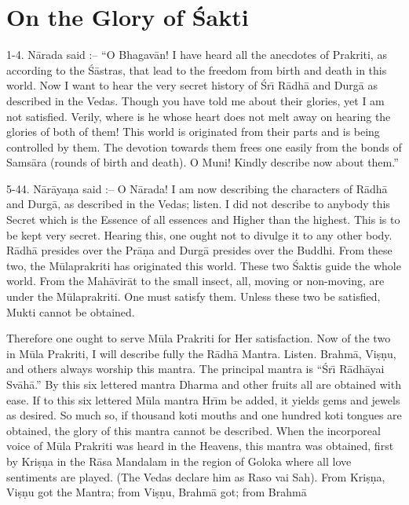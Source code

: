 \chapter{On the Glory of \'Sakti}

1-4. N\=arada said :-- ``O Bhagav\=an! I have heard all the anecdotes of Prakriti, as according to the \'S\=astras, that lead to the freedom from birth and death in this world. Now I want to hear the very secret history of \'Sr\={\i} R\=adh\=a and Durg\=a as described in the Vedas. Though you have told me about their glories, yet I am not satisfied. Verily, where is he whose heart does not melt away on hearing the glories of both of them! This world is originated from their parts and is being controlled by them. The devotion towards them frees one easily from the bonds of Sams\=ara (rounds of birth and death). O Muni! Kindly describe now about them.''

5-44. N\=ar\=aya\d{n}a said :-- O N\=arada! I am now describing the characters of R\=adh\=a and Durg\=a, as described in the Vedas; listen. I did not describe to anybody this Secret which is the Essence of all essences and Higher than the highest. This is to be kept very secret. Hearing this, one ought not to divulge it to any other body. R\=adh\=a presides over the Pr\=a\d{n}a and Durg\=a presides over the Buddhi. From these two, the M\=ulaprakriti has originated this world. These two \'Saktis guide the whole world. From the Mah\=avir\=at to the small insect, all, moving or non-moving, are under the M\=ulaprakriti. One must satisfy them. Unless these two be satisfied, Mukti cannot be obtained.

Therefore one ought to serve M\=ula Prakriti for Her satisfaction. Now of the two in M\=ula Prakriti, I will describe fully the R\=adh\=a Mantra. Listen. Brahm\=a, Vi\d{s}\d{n}u, and others always worship this mantra. The principal mantra is ``\'Sr\={\i} R\=adh\=ayai Sv\=ah\=a.'' By this six lettered mantra Dharma and other fruits all are obtained with ease. If to this six lettered M\=ula mantra Hr\={\i}m be added, it yields gems and jewels as desired. So much so, if thousand koti mouths and one hundred koti tongues are obtained, the glory of this mantra cannot be described. When the incorporeal voice of M\=ula Prakriti was heard in the Heavens, this mantra was obtained, first by Kri\d{s}\d{n}a in the R\=asa Mandalam in the region of Goloka where all love sentiments are played. (The Vedas declare him as Raso vai Sah). From Kri\d{s}\d{n}a, Vi\d{s}\d{n}u got the Mantra; from Vi\d{s}\d{n}u, Brahm\=a got; from Brahm\=a

